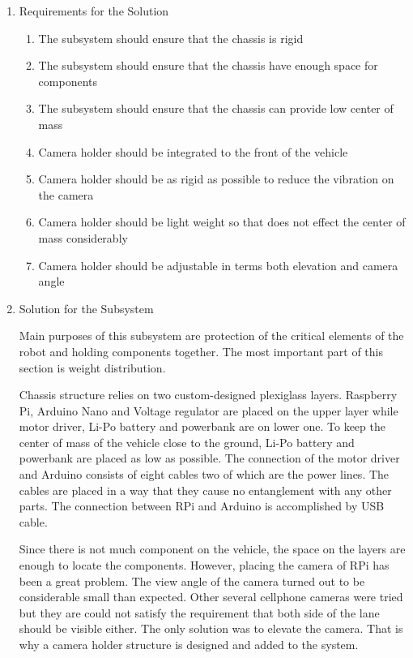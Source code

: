 \documentclass[a4paper,12pt]{article}
\begin{document}
	\begin{enumerate}
		\item {Requirements for the Solution}
		
		\begin{enumerate}
			\item The subsystem should ensure that the chassis is rigid 
			\item The subsystem should ensure that the chassis have enough space for components
			\item The subsystem should ensure that the chassis can provide low center of mass 
			\item Camera holder should be integrated to the front of the vehicle
			\item Camera holder should be as rigid as possible to reduce the vibration on the camera
			\item Camera holder should be light weight so that does not effect the center of mass considerably
			\item Camera holder should be adjustable in terms both elevation and camera angle
		\end{enumerate}


	\item {Solution for the Subsystem}

		Main purposes of this subsystem are protection of the critical elements of the robot and holding components together. The most important part of this section is weight distribution.

		Chassis structure relies on two custom-designed plexiglass layers. Raspberry Pi, Arduino Nano and Voltage regulator are placed on the upper layer while motor driver, Li-Po battery and powerbank are on lower one. To keep the center of mass of the vehicle close to the ground, Li-Po battery and powerbank are placed as low as possible. The connection of the motor driver and Arduino consists of eight cables two of which are the power lines. The cables are placed in a way that they cause no entanglement with any other parts. The connection between RPi and Arduino is accomplished by USB cable. 

		Since there is not much component on the vehicle, the space on the layers are enough to locate the components. However, placing the camera of RPi has been a great problem. The view angle of the camera turned out to be considerable small than expected. Other several cellphone cameras were tried but they are could not satisfy the requirement that both side of the lane should be visible either. The only solution was to elevate the camera. That is why a camera holder structure is designed and added to the system.


\end{enumerate}
\end{document}
